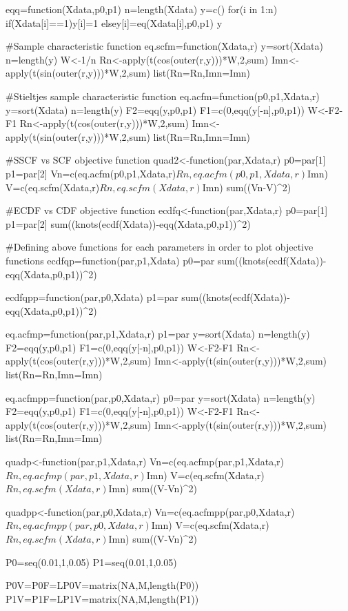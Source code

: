 eqq=function(Xdata,p0,p1){
n=length(Xdata)
y=c()
for(i in 1:n)
{
if(Xdata[i]==1){y[i]=1}
else{y[i]=eq(Xdata[i],p0,p1)
}
}
y
}

#Sample characteristic function
eq.scfm=function(Xdata,r){
   y=sort(Xdata)
   n=length(y)
   W<-1/n
   Rn<-apply(t(cos(outer(r,y)))*W,2,sum)
   Imn<-apply(t(sin(outer(r,y)))*W,2,sum)
   list(Rn=Rn,Imn=Imn)
}

#Stieltjes sample characteristic function
eq.acfm=function(p0,p1,Xdata,r){
   y=sort(Xdata)
   n=length(y)
   F2=eqq(y,p0,p1)
   F1=c(0,eqq(y[-n],p0,p1))
   W<-F2-F1
   Rn<-apply(t(cos(outer(r,y)))*W,2,sum)
   Imn<-apply(t(sin(outer(r,y)))*W,2,sum)
   list(Rn=Rn,Imn=Imn)
}

#SSCF vs SCF objective function
quad2<-function(par,Xdata,r){
    p0=par[1]
    p1=par[2]
    Vn=c(eq.acfm(p0,p1,Xdata,r)$Rn,eq.acfm(p0,p1,Xdata,r)$Imn)
    V=c(eq.scfm(Xdata,r)$Rn,eq.scfm(Xdata,r)$Imn)
    sum((Vn-V)^2)
}

#ECDF vs CDF objective function
ecdfq<-function(par,Xdata,r){
    p0=par[1]
    p1=par[2]
sum((knots(ecdf(Xdata))-eqq(Xdata,p0,p1))^2)
}

#Defining above functions for each parameters in order
 to plot objective functions
ecdfqp=function(par,p1,Xdata){
    p0=par
sum((knots(ecdf(Xdata))-eqq(Xdata,p0,p1))^2)
}

ecdfqpp=function(par,p0,Xdata){
    p1=par
sum((knots(ecdf(Xdata))-eqq(Xdata,p0,p1))^2)
}

eq.acfmp=function(par,p1,Xdata,r){
   p1=par
   y=sort(Xdata)
   n=length(y)
   F2=eqq(y,p0,p1)
   F1=c(0,eqq(y[-n],p0,p1))
   W<-F2-F1
   Rn<-apply(t(cos(outer(r,y)))*W,2,sum)
   Imn<-apply(t(sin(outer(r,y)))*W,2,sum)
   list(Rn=Rn,Imn=Imn)
}

eq.acfmpp=function(par,p0,Xdata,r){
   p0=par
   y=sort(Xdata)
   n=length(y)
   F2=eqq(y,p0,p1)
   F1=c(0,eqq(y[-n],p0,p1))
   W<-F2-F1
   Rn<-apply(t(cos(outer(r,y)))*W,2,sum)
   Imn<-apply(t(sin(outer(r,y)))*W,2,sum)
   list(Rn=Rn,Imn=Imn)
}

quadp<-function(par,p1,Xdata,r){
   Vn=c(eq.acfmp(par,p1,Xdata,r)$Rn,eq.acfmp(par,p1,Xdata,r)$Imn)
    V=c(eq.scfm(Xdata,r)$Rn,eq.scfm(Xdata,r)$Imn)
    sum((V-Vn)^2)
}

quadpp<-function(par,p0,Xdata,r){
   Vn=c(eq.acfmpp(par,p0,Xdata,r)$Rn,eq.acfmpp(par,p0,Xdata,r)$Imn)
    V=c(eq.scfm(Xdata,r)$Rn,eq.scfm(Xdata,r)$Imn)
    sum((V-Vn)^2)
}

 P0=seq(0.01,1,0.05)
 P1=seq(0.01,1,0.05)

 P0V=P0F=LP0V=matrix(NA,M,length(P0))
 P1V=P1F=LP1V=matrix(NA,M,length(P1))

